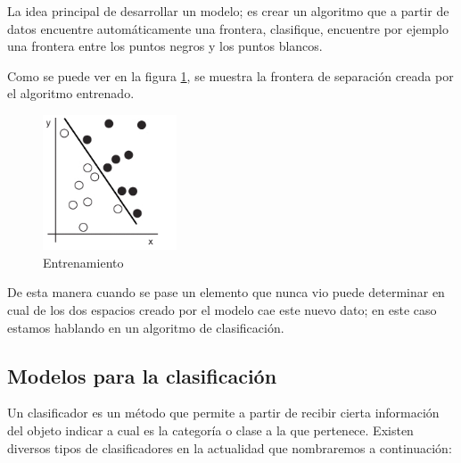 La idea principal de desarrollar un modelo; es crear un algoritmo que a partir de datos encuentre automáticamente una frontera, clasifique, encuentre por ejemplo una frontera entre los puntos negros y los puntos blancos.

Como se puede ver en la figura \ref{Fig:ejemplo-2}, se muestra la frontera de separación creada por el algoritmo entrenado.
\begin{figure}[H] \centering
  \includegraphics[height=4cm,keepaspectratio=true,clip=true]{imagenes/MarcoTeorico/sample-fit-1.png}
  \caption{Entrenamiento}\label{Fig:ejemplo-2}
\end{figure}

De esta manera cuando se pase un elemento que nunca vio puede determinar en cual de los dos espacios creado por el modelo cae este nuevo dato; en este caso estamos hablando en un algoritmo de clasificación.


\subsection{Modelos para la clasificación}\label{sub:clasificadores}

Un clasificador es un método que permite a partir de recibir cierta información del objeto indicar a cual es la categoría o clase a la que pertenece. Existen diversos tipos de clasificadores en la actualidad que nombraremos a continuación:


